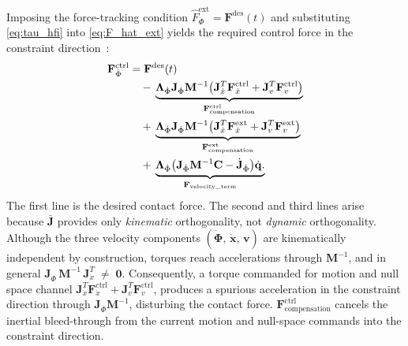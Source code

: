 \documentclass[
	german,%
	accentcolor=9c,%
	ruledheaders=section,%
	class=report,%
	thesis={type=bachelor},%
	fontsize=11pt,%
	parskip=half-,%
	custommargins=true,%
	marginpar=false,%
]{tudapub}
\begin{document}
Imposing the force-tracking condition
$\hat{F}^{\text{ext}}_{\dot{\Phi}} = \mathbf{F}^{\text{des}}(t)$
and substituting \eqref{eq:tau_hfi} into \eqref{eq:F_hat_ext} yields the
required control force in the constraint direction~\cite[Eq.~19]{iskandar2023}:
\begin{align}
    \mathbf{F}^{\text{ctrl}}_{\dot{\Phi}}
    &= \mathbf{F}^{\text{des}}(t) \notag \\
    &\quad -\, \underbrace{
            \boldsymbol{\Lambda}_{\dot{\Phi}}
            \mathbf{J}_{\dot{\Phi}}\mathbf{M}^{-1}
            \bigl(
                \mathbf{J}_{\dot{x}}^{T}\mathbf{F}^{\text{ctrl}}_{\dot{x}}
                + \mathbf{J}_{v}^{T}\mathbf{F}^{\text{ctrl}}_{v}
            \bigr)
        }_{\mathbf{F}^{\text{ctrl}}_{\text{compensation}}} \notag \\
    &\quad +\, \underbrace{
            \boldsymbol{\Lambda}_{\dot{\Phi}}
            \mathbf{J}_{\dot{\Phi}}\mathbf{M}^{-1}
            \bigl(
                \mathbf{J}_{\dot{x}}^{T}\mathbf{F}^{\text{ext}}_{\dot{x}}
                + \mathbf{J}_{v}^{T}\mathbf{F}^{\text{ext}}_{v}
            \bigr) 
        }_{\mathbf{F}^{\text{ext}}_{\text{compensation}}}\notag \\
    &\quad +\, \underbrace{
            \boldsymbol{\Lambda}_{\dot{\Phi}}
            \bigl(
                \mathbf{J}_{\dot{\Phi}}\mathbf{M}^{-1}\mathbf{C}
                - \dot{\mathbf{J}}_{\dot{\Phi}}
            \bigr)\dot{\mathbf{q}}.
            }_{\mathbf{F}_{\text{velocity\_term}}}
    \label{eq:F_ctrl_force}
\end{align}
The first line is the desired contact force.
The second and third lines arise because $\bar{\mathbf{J}}$ provides only
\emph{kinematic} orthogonality, not \emph{dynamic} orthogonality.
Although the three velocity components $(\dot{\boldsymbol{\Phi}},\,
\dot{\mathbf{x}},\, \mathbf{v})$ are kinematically independent by
construction, torques reach accelerations through $\mathbf{M}^{-1}$, and
in general $\mathbf{J}_{\dot{\Phi}}\,\mathbf{M}^{-1}\,\mathbf{J}_{\dot{x}}^{T}\;\neq\; \mathbf{0}$.
Consequently, a torque commanded for motion and null space channel 
$\mathbf{J}_{\dot{x}}^{T}\mathbf{F}^{\text{ctrl}}_{\dot{x}} +
\mathbf{J}_{v}^{T}\mathbf{F}^{\text{ctrl}}_{v}$,
produces a spurious acceleration in the constraint direction through
$\mathbf{J}_{\dot{\Phi}}\mathbf{M}^{-1}$, disturbing the contact force.
$\mathbf{F}^{\text{ctrl}}_{\text{compensation}}$ cancels the inertial bleed-through from the current
motion and null-space commands into the constraint direction.
\end{document}
